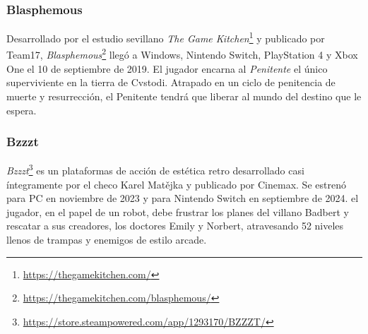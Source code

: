 \subsubsection{Blasphemous}
Desarrollado por el estudio sevillano \emph{The Game Kitchen}\footnote{\url{https://thegamekitchen.com/}} y publicado por Team17, \textit{Blasphemous}\footnote{\url{https://thegamekitchen.com/blasphemous/}} llegó a Windows, Nintendo Switch, PlayStation 4 y Xbox One el 10 de septiembre de 2019. El jugador encarna al \textit{Penitente} el único superviviente en la tierra de Cvstodi. Atrapado en un ciclo de penitencia de muerte y resurrección, el Penitente tendrá que liberar al mundo del destino que le espera.

\subsubsection{Bzzzt}

\textit{Bzzzt}\footnote{\url{https://store.steampowered.com/app/1293170/BZZZT/}} es un plataformas de acción de estética retro desarrollado casi íntegramente por el checo Karel Matějka  y publicado por Cinemax. Se estrenó para PC en noviembre de 2023 y para Nintendo Switch en septiembre de 2024. el jugador, en el papel de un robot, debe frustrar los planes del villano Badbert y rescatar a sus creadores, los doctores Emily y Norbert, atravesando 52 niveles llenos de trampas y enemigos de estilo arcade.

